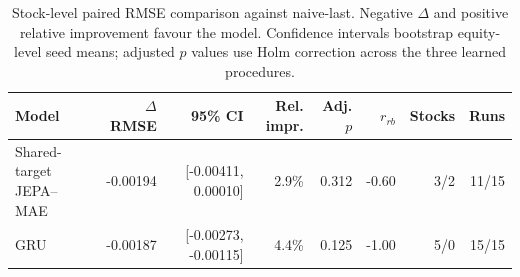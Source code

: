 \begin{table}[t]
\centering
\small
\caption{Stock-level paired RMSE comparison against naive-last. Negative $\Delta$ and positive relative improvement favour the model. Confidence intervals bootstrap equity-level seed means; adjusted $p$ values use Holm correction across the three learned procedures.}
\label{tab:paired_rmse_naive}
\begin{tabular}{lrrrrrrr}
\toprule
Model & $\Delta$RMSE & 95\% CI & Rel. impr. & Adj. $p$ & $r_{rb}$ & Stocks & Runs \\
\midrule
Shared-target JEPA--MAE & -0.00194 & [-0.00411, 0.00010] & 2.9\% & 0.312 & -0.60 & 3/2 & 11/15 \\
GRU & -0.00187 & [-0.00273, -0.00115] & 4.4\% & 0.125 & -1.00 & 5/0 & 15/15 \\
\bottomrule
\end{tabular}
\end{table}
